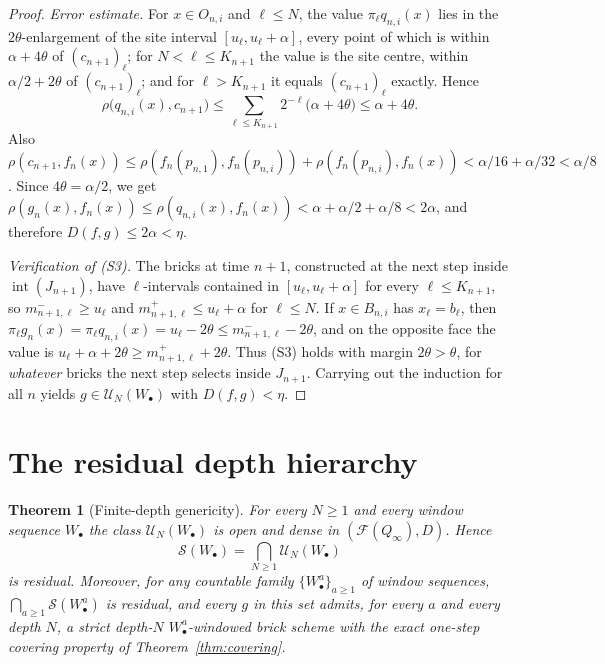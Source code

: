 \documentclass[11pt]{article}
\newtheorem{theorem}{Theorem}[section]
\newcommand{\Q}{Q_\infty}
\newcommand{\F}{\mathcal{F}}
\begin{document}
\begin{proof}
\emph{Error estimate.}  For $x\in O_{n,i}$ and $\ell\le N$, the value
$\pi_\ell q_{n,i}(x)$ lies in the $2\theta$-enlargement of the site interval
$[u_\ell,u_\ell+\alpha]$, every point of which is within $\alpha+4\theta$ of
$(c_{n+1})_\ell$; for $N<\ell\le K_{n+1}$ the value is the site centre, within
$\alpha/2+2\theta$ of $(c_{n+1})_\ell$; and for $\ell>K_{n+1}$ it equals
$(c_{n+1})_\ell$ exactly.  Hence
\[
\rho\bigl(q_{n,i}(x),c_{n+1}\bigr)
\le\sum_{\ell\le K_{n+1}}2^{-\ell}\bigl(\alpha+4\theta\bigr)
\le\alpha+4\theta .
\]
Also
$\rho(c_{n+1},f_n(x))\le\rho(f_n(p_{n,1}),f_n(p_{n,i}))+\rho(f_n(p_{n,i}),f_n(x))
<\alpha/16+\alpha/32<\alpha/8$.  Since $4\theta=\alpha/2$, we get
$\rho(g_n(x),f_n(x))\le\rho(q_{n,i}(x),f_n(x))<\alpha+\alpha/2+\alpha/8<2\alpha$,
and therefore $D(f,g)\le2\alpha<\eta$.

\emph{Verification of (S3).}  The bricks at time $n+1$, constructed at the next step
inside $\operatorname{int}(J_{n+1})$, have $\ell$-intervals contained in
$[u_\ell,u_\ell+\alpha]$ for every $\ell\le K_{n+1}$, so
$m^-_{n+1,\ell}\ge u_\ell$ and $m^+_{n+1,\ell}\le u_\ell+\alpha$ for $\ell\le N$.
If $x\in B_{n,i}$ has $x_\ell=b_\ell$, then
$\pi_\ell g_n(x)=\pi_\ell q_{n,i}(x)=u_\ell-2\theta\le m^-_{n+1,\ell}-2\theta$,
and on the opposite face the value is
$u_\ell+\alpha+2\theta\ge m^+_{n+1,\ell}+2\theta$.  Thus (S3) holds with margin
$2\theta>\theta$, for \emph{whatever} bricks the next step selects inside $J_{n+1}$.
Carrying out the induction for all $n$ yields $g\in\mathcal U_N(W_\bullet)$ with
$D(f,g)<\eta$.
\end{proof}

\section{The residual depth hierarchy}\label{sec:residual}

\begin{theorem}[Finite-depth genericity]\label{thm:main}
For every $N\ge1$ and every window sequence $W_\bullet$ the class
$\mathcal U_N(W_\bullet)$ is open and dense in $(\F(\Q),D)$.  Hence
\[
\mathcal S(W_\bullet)=\bigcap_{N\ge1}\mathcal U_N(W_\bullet)
\]
is residual.  Moreover, for any countable family $\{W^a_\bullet\}_{a\ge1}$ of window
sequences, $\bigcap_{a\ge1}\mathcal S(W^a_\bullet)$ is residual, and every
$g$ in this set admits, for every $a$ and every depth $N$, a strict depth-$N$
$W^a_\bullet$-windowed brick scheme with the exact one-step covering property of
Theorem~\ref{thm:covering}.
\end{theorem}
\end{document}
